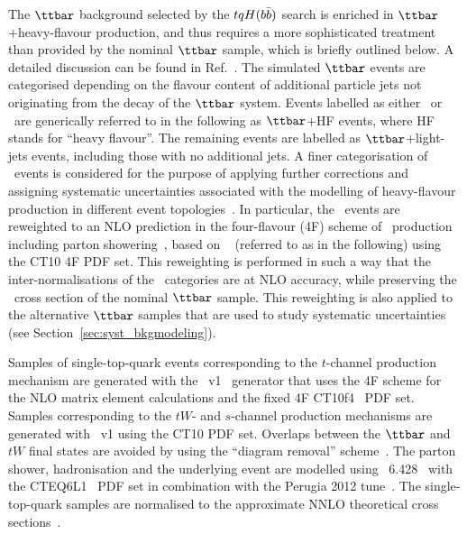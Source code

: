 The $\ttbar$ background selected by the $tqH(b\bar{b})$ search is enriched in $\ttbar$+heavy-flavour production, and thus requires a more sophisticated 
treatment than provided by the nominal $\ttbar$ sample, which is briefly outlined below. A detailed discussion can be found in Ref.~\cite{Aaboud:2017rss}.
The simulated $\ttbar$ events are categorised depending 
on the flavour content of additional particle jets not originating from the decay of the $\ttbar$ system.
Events labelled as either \ttbin\ or \ttcin\ are generically referred to in the following as $\ttbar$+HF events, where HF stands for ``heavy flavour''.
The remaining events are labelled as $\ttbar$+light-jets events, including those with no additional jets. 
A finer categorisation of \ttbin\ events is considered for the purpose of applying further corrections and
assigning systematic uncertainties associated with the modelling of heavy-flavour production in different event topologies~\cite{Aaboud:2017rss}.
In particular, the \ttbin\ events are reweighted to an NLO prediction in the four-flavour (4F) scheme 
of \ttbin\ production including parton showering~\cite{Cascioli:2013era}, based on {\ShOLlong}~\cite{Gleisberg:2008ta, Cascioli:2011va} (referred to as {\ShOL} 
in the following) using the CT10 4F PDF set.  This reweighting is performed in such a way that the inter-normalisations of the \ttbin\ categories are at NLO accuracy, 
while preserving the \ttbin\ cross section of the nominal $\ttbar$ sample. 
This reweighting is also applied to the alternative $\ttbar$ samples that are used to study systematic uncertainties (see Section~\ref{sec:syst_bkgmodeling}).

Samples of single-top-quark events corresponding to the $t$-channel production mechanism are generated with the 
{\powheg}~v1~\cite{Frederix:2012dh} generator that uses the 4F scheme  for the NLO matrix element calculations
and the fixed 4F \textsc{CT10}f\textsc{4}~\cite{Lai:2010vv} PDF set.
Samples corresponding to the $tW$- and $s$-channel production mechanisms are generated 
with {\powheg}~v1 using the CT10 PDF set. Overlaps between the $\ttbar$ and $tW$ final states are avoided by using 
the ``diagram removal'' scheme~\cite{Frixione:2005vw}.
The parton shower, hadronisation and the underlying event are modelled using {\pythia}~6.428~\cite{Sjostrand:2006za} 
with the CTEQ6L1~\cite{Pumplin:2002vw,Nadolsky:2008zw} PDF set 
in combination with the Perugia 2012 tune~\cite{Skands:2010ak}.
The single-top-quark samples are normalised to the approximate NNLO theoretical cross 
sections~\cite{Kidonakis:2011wy,Kidonakis:2010ux,Kidonakis:2010tc}. 

